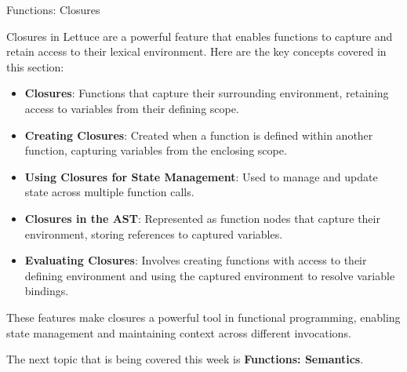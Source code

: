\begin{notes}{Functions: Closures}
\begin{highlight}
    \end{highlight}
    
    \begin{highlight}
    
        Closures in Lettuce are a powerful feature that enables functions to capture and retain access to their lexical environment. Here are the key concepts covered in this section:
    
        \begin{itemize}
            \item \textbf{Closures}: Functions that capture their surrounding environment, retaining access to variables from their defining scope.
            \item \textbf{Creating Closures}: Created when a function is defined within another function, capturing variables from the enclosing scope.
            \item \textbf{Using Closures for State Management}: Used to manage and update state across multiple function calls.
            \item \textbf{Closures in the AST}: Represented as function nodes that capture their environment, storing references to captured variables.
            \item \textbf{Evaluating Closures}: Involves creating functions with access to their defining environment and using the captured environment to resolve variable bindings.
        \end{itemize}
    
        These features make closures a powerful tool in functional programming, enabling state management and maintaining context across different invocations.
    
    \end{highlight}
\end{notes}

The next topic that is being covered this week is \textbf{Functions: Semantics}.

